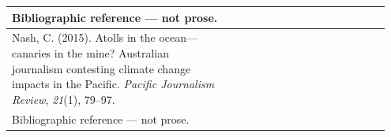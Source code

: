 \documentclass[11pt]{article}
\begin{document}
\begin{longtable}{|p{0.55\linewidth}|p{0.40\linewidth}|}
\hline
Bibliographic reference --- not prose. & \\
\hline
Nash, C. (2015). Atolls in the ocean---canaries in the mine? Australian journalism contesting climate change impacts in the Pacific. \textit{Pacific Journalism Review}, \textit{21}(1), 79--97. & \\[2pt]
\hline
Bibliographic reference --- not prose. & \\
\hline
\end{longtable}
\end{document}
